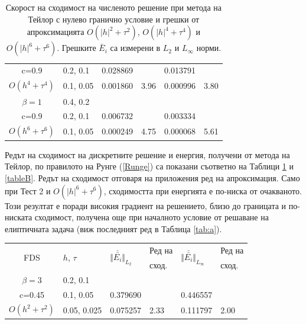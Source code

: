\documentclass[a5paper]{article}
\newcommand{\rf}[1]{(\ref{#1})}
\theoremstyle{remark}
\begin{document}
\begin{large}
\begin{table}[ht]
\begin{small}
\begin{tabular}{||c|l|ll|ll||}
       c=0.9                 &0.2, 0.1     & 0.028869   &        &  0.013791   &   \\
 $O(h^4+ \tau^4)$ 	&0.1, 0.05   	&0.001860 	& 3.96  & 0.000996  & 3.80  \\
\hline
  $\beta=1$     		&0.4, 0.2   	&            	&          	&                  &      \\
      c=0.9                  &0.2, 0.1   	&0.006732 	&            & 0.003334      &       \\
 $O(h^6+ \tau^6)$ 	&0.1, 0.05 	& 0.000249 	& 4.75 	& 0.000068  & 5.61        \\
\hline
\hline 
		\end{tabular}
		\caption{Скорост на сходимост на численото решение при метода на Тейлор с нулево гранично условие и грешки от апроксимацията $O(|h|^{2} + \tau^2 )$, $O(|h|^{4} + \tau^4 )$ и $O(|h|^{6} + \tau^6 )$. Грешките $\bar E_i$ са измерени в $L_2$ и $L_\infty$ норми.}
\label{tableA}
\end{small}
\end{table}
Редът на сходимост на дискретните решение и енергия, получени от метода на Тейлор, по правилото на Рунге \rf{Runge} са показани съответно на Таблици \ref{tableA} и \ref{tableB}. Редът на сходимост отговаря на приложения ред на апроксимация. Само при Тест 2 и $O(|h|^6 + \tau^6)$, сходимостта при енергията е по-ниска от очакваното. Този резултат е поради високия градиент на решението, близо до границата и по-ниската сходимост, получена още при началното условие от решаване на елиптичната задача (виж последният ред в Таблица \ref{tab:a}).
\begin{table}[ht]
\begin{small}
\centering
\small
		\begin{tabular}{||c|l|ll|ll||}
			\hline
			\hline
      \multirow{2  }{*}{FDS}        & \multirow{2  }{*}{$h$, $\tau$}  &  	\multirow{2  }{*}{ $\Vert \bar{\bar{ E_i}} \Vert_{L_2}$ }	&Ред на	& \multirow{2  }{*}{ $\Vert \bar{\bar{ E_i}} \Vert_{L_\infty}$ } 		&Ред на   \\
	                                        &                                                & 							 					&  сход. 	& 								       					& сход. \\
   			\hline 
					\hline 
  $\beta=3$             	&0.2, 0.1         	&              	&          	&                     &      \\
   c=0.45                 	&0.1, 0.05         	&0.379690  	&          	&0.446557 		&       \\
 $O(h^2 + \tau^ 2)$ 	&0.05, 0.025  	& 0.075257 	& 2.33  	& 0.111797     	& 2.00      \\

\end{tabular}
\end{small}
\end{table}
\end{large}
\end{document}
